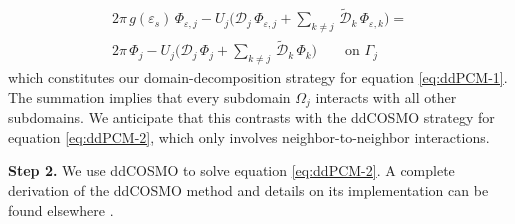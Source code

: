 \begin{multline}\label{eq:1}
2\pi \, g(\varepsilon_s) \, \Phi_{\varepsilon,j} - U_j \bigg( {\mathcal{D}}_j \, \Phi_{\varepsilon,j} + \sum_{k \ne j} \, \tilde{\mathcal{D}}_{k} \, \Phi_{\varepsilon,k}  \bigg) = \\ 2 \pi \, {\Phi_j} - U_j \bigg( {\mathcal{D}}_j \,\Phi_{j} + \sum_{k \ne j} \, \tilde{\mathcal{D}}_{k} \, \Phi_{k}  \bigg) \qquad \text{on }\Gamma_j
\end{multline}
which constitutes our domain-decomposition strategy for equation \eqref{eq:ddPCM-1}. The summation implies that every subdomain $\Omega_j$ interacts with all other subdomains. We anticipate that this contrasts with the ddCOSMO strategy for equation \eqref{eq:ddPCM-2}, which only involves neighbor-to-neighbor interactions.

{\bf Step 2.} 
We use ddCOSMO to solve equation \eqref{eq:ddPCM-2}. A complete derivation of the ddCOSMO method and details on its implementation can be found elsewhere \cite{Cances_JCP_ddCOSMO,Lipparini_JCTC_ddCOSMO}. 


